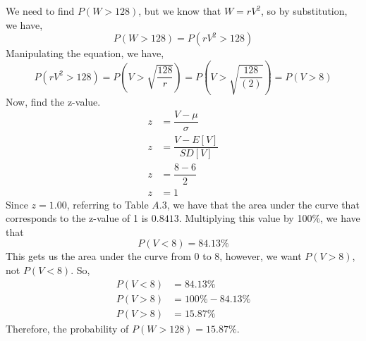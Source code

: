 \documentclass[12pt]{book}
\begin{document}
\begin{enumerate}
\begin{enumerate}
        We need to find $P(W > 128)$, but we know that $W = rV^2$, so by substitution, we have,
        $$P(W > 128) = P(rV^2 > 128)$$
        Manipulating the equation, we have,
        $$P(rV^2 > 128) = P\left(V > \sqrt{\dfrac{128}{r}}\right) = P\left(V > \sqrt{\dfrac{128}{(2)}}\right) = P(V>8)$$
        Now, find the z-value.
        \begin{align*}
            z &= \dfrac{V-\mu}{\sigma}\\
            z &= \dfrac{V-E[V]}{SD[V]}\\
            z &= \dfrac{8-6}{2}\\
            z &= 1
        \end{align*}
        Since $z = 1.00$, referring to Table $A.3$, we have that the area under the curve that corresponds to the z-value of 1 is $0.8413$. Multiplying this value by 100\%, we have that
        $$P(V<8) = 84.13\%$$
        This gets us the area under the curve from 0 to 8, however, we want $P(V>8)$, not $P(V<8)$. So,
        \begin{align*}
            P(V<8) &= 84.13\%\\
            P(V>8) &= 100\% - 84.13\%\\
            P(V>8) &= 15.87\%
        \end{align*}
        Therefore, the probability of $P(W>128) = 15.87\%$.
    \end{enumerate}
    
    


\end{enumerate}
\end{document}
